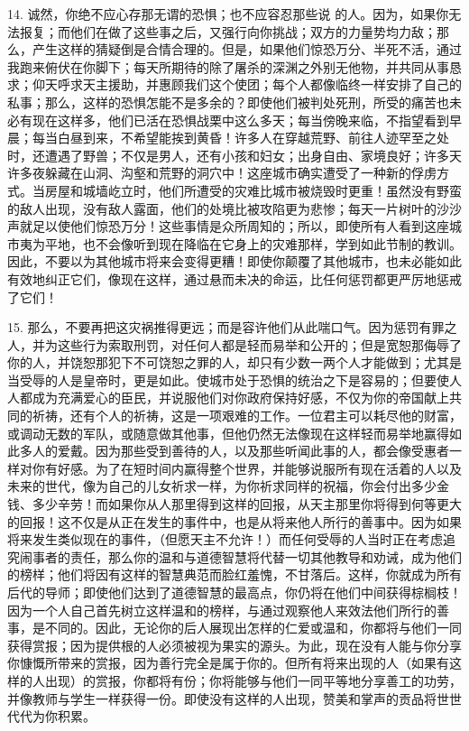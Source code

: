 14. 诚然，你绝不应心存那无谓的恐惧；也不应容忍那些说 的人。因为，如果你无法报复；而他们在做了这些事之后，又强行向你挑战；双方的力量势均力敌；那么，产生这样的猜疑倒是合情合理的。但是，如果他们惊恐万分、半死不活，通过我跑来俯伏在你脚下；每天所期待的除了屠杀的深渊之外别无他物，并共同从事恳求；仰天呼求天主援助，并惠顾我们这个使团；每个人都像临终一样安排了自己的私事；那么，这样的恐惧怎能不是多余的？即使他们被判处死刑，所受的痛苦也未必有现在这样多，他们已活在恐惧战栗中这么多天；每当傍晚来临，不指望看到早晨；每当白昼到来，不希望能挨到黄昏！许多人在穿越荒野、前往人迹罕至之处时，还遭遇了野兽；不仅是男人，还有小孩和妇女；出身自由、家境良好；许多天许多夜躲藏在山洞、沟壑和荒野的洞穴中！这座城市确实遭受了一种新的俘虏方式。当房屋和城墙屹立时，他们所遭受的灾难比城市被烧毁时更重！虽然没有野蛮的敌人出现，没有敌人露面，他们的处境比被攻陷更为悲惨；每天一片树叶的沙沙声就足以使他们惊恐万分！这些事情是众所周知的；所以，即使所有人看到这座城市夷为平地，也不会像听到现在降临在它身上的灾难那样，学到如此节制的教训。因此，不要以为其他城市将来会变得更糟！即使你颠覆了其他城市，也未必能如此有效地纠正它们，像现在这样，通过悬而未决的命运，比任何惩罚都更严厉地惩戒了它们！\par

15. 那么，不要再把这灾祸推得更远；而是容许他们从此喘口气。因为惩罚有罪之人，并为这些行为索取刑罚，对任何人都是轻而易举和公开的；但是宽恕那侮辱了你的人，并饶恕那犯下不可饶恕之罪的人，却只有少数一两个人才能做到；尤其是当受辱的人是皇帝时，更是如此。使城市处于恐惧的统治之下是容易的；但要使人人都成为充满爱心的臣民，并说服他们对你政府保持好感，不仅为你的帝国献上共同的祈祷，还有个人的祈祷，这是一项艰难的工作。一位君主可以耗尽他的财富，或调动无数的军队，或随意做其他事，但他仍然无法像现在这样轻而易举地赢得如此多人的爱戴。因为那些受到善待的人，以及那些听闻此事的人，都会像受惠者一样对你有好感。为了在短时间内赢得整个世界，并能够说服所有现在活着的人以及未来的世代，像为自己的儿女祈求一样，为你祈求同样的祝福，你会付出多少金钱、多少辛劳！而如果你从人那里得到这样的回报，从天主那里你将得到何等更大的回报！这不仅是从正在发生的事件中，也是从将来他人所行的善事中。因为如果将来发生类似现在的事件，（但愿天主不允许！）而任何受辱的人当时正在考虑追究闹事者的责任，那么你的温和与道德智慧将代替一切其他教导和劝诫，成为他们的榜样；他们将因有这样的智慧典范而脸红羞愧，不甘落后。这样，你就成为所有后代的导师；即使他们达到了道德智慧的最高点，你仍将在他们中间获得棕榈枝！因为一个人自己首先树立这样温和的榜样，与通过观察他人来效法他们所行的善事，是不同的。因此，无论你的后人展现出怎样的仁爱或温和，你都将与他们一同获得赏报；因为提供根的人必须被视为果实的源头。为此，现在没有人能与你分享你慷慨所带来的赏报，因为善行完全是属于你的。但所有将来出现的人（如果有这样的人出现）的赏报，你都将有份；你将能够与他们一同平等地分享善工的功劳，并像教师与学生一样获得一份。即使没有这样的人出现，赞美和掌声的贡品将世世代代为你积累。\par

